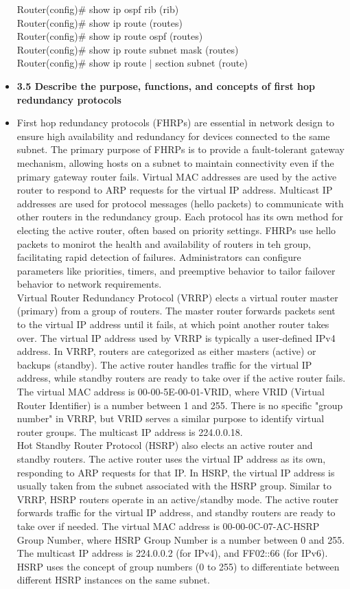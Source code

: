 \documentclass{article}
\begin{document}
\begin{itemize}
  		Router(config)\# show ip ospf rib (rib)\\
  		
  		Router(config)\# show ip route (routes)\\
  		Router(config)\# show ip route ospf (routes)\\
  		Router(config)\# show ip route subnet mask (routes)\\
  		Router(config)\# show ip route $\mid$ section subnet (route)
  
  \item \textbf{3.5 Describe the purpose, functions, and concepts of first hop redundancy protocols}
  	\item[] First hop redundancy protocols (FHRPs) are essential in network design to ensure high availability and redundancy for devices connected to the same subnet. The primary purpose of FHRPs is to provide a fault-tolerant gateway mechanism, allowing hosts on a subnet to maintain connectivity even if the primary gateway router fails. Virtual MAC addresses are used by the active router to respond to ARP requests for the virtual IP address. Multicast IP addresses are used for protocol messages (hello packets) to communicate with other routers in the redundancy group. Each protocol has its own method for electing the active router, often based on priority settings. FHRPs use hello packets to monirot the health and availability of routers in teh group, facilitating rapid detection of failures. Administrators can configure parameters like priorities, timers, and preemptive behavior to tailor failover behavior to network requirements.\\
	Virtual Router Redundancy Protocol (VRRP) elects a virtual router master (primary) from a group of routers. The master router forwards packets sent to the virtual IP address until it fails, at which point another router takes over. The virtual IP address used by VRRP is typically a user-defined IPv4 address. In VRRP, routers are categorized as either masters (active) or backups (standby). The active router handles traffic for the virtual IP address, while standby routers are ready to take over if the active router fails. The virtual MAC address is 00-00-5E-00-01-{VRID}, where VRID (Virtual Router Identifier) is a number between 1 and 255. There is no specific "group number" in VRRP, but VRID serves a similar purpose to identify virtual router groups. The multicast IP address is 224.0.0.18.\\
	Hot Standby Router Protocol (HSRP)  also elects an active router and standby routers. The active router uses the virtual IP address as its own, responding to ARP requests for that IP. In HSRP, the virtual IP address is usually taken from the subnet associated with the HSRP group. Similar to VRRP, HSRP routers operate in an active/standby mode. The active router forwards traffic for the virtual IP address, and standby routers are ready to take over if needed. The virtual MAC address is 00-00-0C-07-AC-{HSRP Group Number}, where HSRP Group Number is a number between 0 and 255. The multicast IP address is 224.0.0.2 (for IPv4), and FF02::66 (for IPv6). HSRP uses the concept of group numbers (0 to 255) to differentiate between different HSRP instances on the same subnet.\\

\end{itemize}
\end{document}
